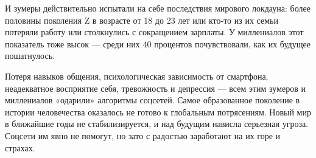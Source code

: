 И зумеры действительно испытали на себе последствия мирового локдауна: более половины поколения Z в возрасте от 18 до 23 лет или кто-то из их семьи потеряли работу или столкнулись с сокращением зарплаты. У миллениалов этот показатель тоже высок — среди них 40 процентов почувствовали, как их будущее пошатнулось.

Потеря навыков общения, психологическая зависимость от смартфона, неадекватное восприятие себя, тревожность и депрессия — всем этим зумеров и миллениалов «одарили» алгоритмы соцсетей. Самое образованное поколение в истории человечества оказалось не готово к глобальным потрясениям. Новый мир в ближайшие годы не стабилизируется, и над будущим нависла серьезная угроза. Соцсети им явно не помогут, но зато с радостью заработают на их горе и страхах.